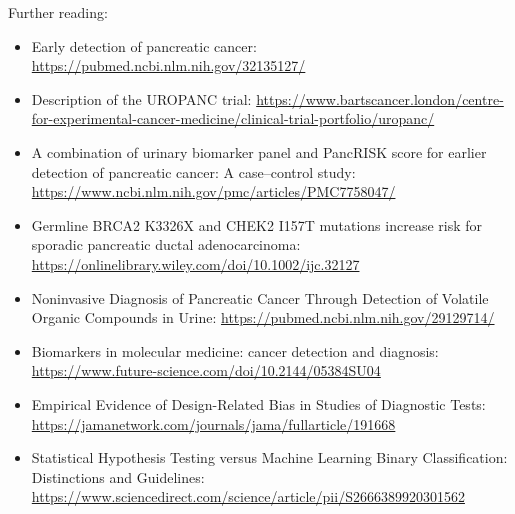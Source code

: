 \documentclass[a4paper,11pt]{scrartcl}
\theoremstyle{plain}
\theoremstyle{remark}
\theoremstyle{definition}
\begin{document}
\begin{landscape}
\begin{large}
Further reading:
\begin{itemize}
\item Early detection of pancreatic cancer: \url{https://pubmed.ncbi.nlm.nih.gov/32135127/}
\item Description of the UROPANC trial: \url{https://www.bartscancer.london/centre-for-experimental-cancer-medicine/clinical-trial-portfolio/uropanc/}
\item A combination of urinary biomarker panel and PancRISK score for earlier detection of pancreatic cancer: A case–control study: \url{https://www.ncbi.nlm.nih.gov/pmc/articles/PMC7758047/}
\item Germline BRCA2 K3326X and CHEK2 I157T mutations increase risk for sporadic pancreatic ductal adenocarcinoma: \url{https://onlinelibrary.wiley.com/doi/10.1002/ijc.32127}
\item Noninvasive Diagnosis of Pancreatic Cancer Through Detection of Volatile Organic Compounds in Urine: \url{https://pubmed.ncbi.nlm.nih.gov/29129714/}
\item Biomarkers in molecular medicine: cancer detection and diagnosis: \url{https://www.future-science.com/doi/10.2144/05384SU04}
\item Empirical Evidence of Design-Related Bias in Studies of Diagnostic Tests: \url{https://jamanetwork.com/journals/jama/fullarticle/191668}
\item Statistical Hypothesis Testing versus Machine Learning Binary Classification: Distinctions and Guidelines: \url{https://www.sciencedirect.com/science/article/pii/S2666389920301562}
\end{itemize}



\end{large}
\label{sec:endpage}
\end{landscape}
\end{document}
